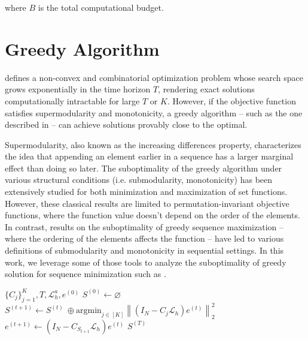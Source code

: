 \documentclass[12pt]{article}
\begin{document}
where $B$ is the total computational budget.

\section{Greedy Algorithm} \label{sec:greedy}

 defines a non-convex and combinatorial optimization problem whose search space grows exponentially in the time horizon $T$, rendering exact solutions computationally intractable for large $T$ or $K$. However, if the objective function satisfies supermodularity and monotonicity, a greedy algorithm -- such as the one described in  -- can achieve solutions provably close to the optimal.

Supermodularity, also known as the increasing differences property, characterizes the idea that appending an element earlier in a sequence has a larger marginal effect than doing so later. The suboptimality of the greedy algorithm under various structural conditions (i.e. submodularity, monotonicity) has been extensively studied for both minimization \cite{liberty2017greedy,bounia2023approximating}  and maximization \cite{nemhauser1978analysis,das2018approximate,feige2011maximizing,bian2017guarantees,harshaw2019submodular} of set functions. However, these classical results are limited to permutation-invariant objective functions, where the function value doesn't depend on the order of the elements. In contrast, results on the suboptimality of greedy sequence maximization \cite{streeter2008online,alaei2021maximizing,zhang2015string,bernardini2020through,van2024performance,tschiatschek2017selecting} -- where the ordering of the elements affects the function -- have led to various definitions of submodularity and monotonicity in sequential settings. In this work, we leverage some of those tools to analyze the suboptimality of greedy solution for sequence minimization such as .

\begin{algorithm} 
\caption{Greedy Algorithm}\label{alg:greedy}
\begin{algorithmic}
\Require $\{C_{j}\}_{j = 1}^{K}, T, \mathcal{L}_h^a, e^{(0)}$
\State $S^{(0)} \gets \varnothing$
    \State $S^{(t + 1)} \gets S^{(t)} \ \oplus \text{argmin}_{j \in [K]}\left\|\left( I_N - C_{j} \mathcal{L}_{h}\right)e^{(t)}\right\|^2_2$
    \State $e^{(t + 1)} \gets \left(I_N - C_{S_{t+ 1}} \mathcal{L}_{h}\right)e^{(t)}$
\EndFor
\State \Return $S^{(T)}$
\end{algorithmic}
\end{algorithm}
\end{document}
